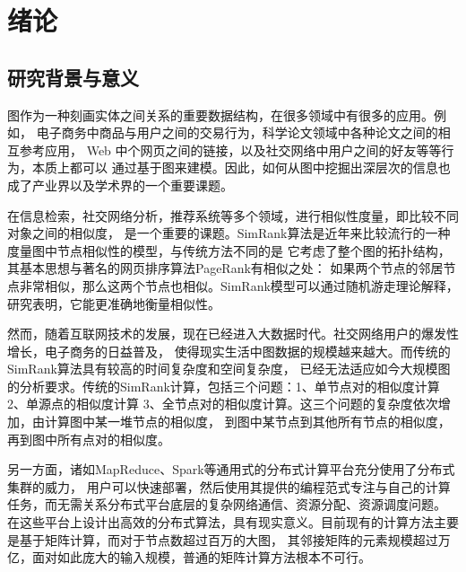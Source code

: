 \documentclass[master]{njuthesis}
\begin{document}
\listoffigures

\listoftables

\mainmatter

\chapter{绪论}\label{chapter_introduction}
\section{研究背景与意义}

图作为一种刻画实体之间关系的重要数据结构，在很多领域中有很多的应用。例如，
电子商务中商品与用户之间的交易行为，科学论文领域中各种论文之间的相互参考应用，
Web 中个网页之间的链接，以及社交网络中用户之间的好友等等行为，本质上都可以
通过基于图来建模。因此，如何从图中挖掘出深层次的信息也成了产业界以及学术界的一个重要课题。

在信息检索，社交网络分析，推荐系统等多个领域，进行相似性度量，即比较不同对象之间的相似度，
是一个重要的课题。SimRank算法是近年来比较流行的一种度量图中节点相似性的模型，与传统方法不同的是
它考虑了整个图的拓扑结构，其基本思想与著名的网页排序算法PageRank有相似之处：
如果两个节点的邻居节点非常相似，那么这两个节点也相似。SimRank模型可以通过随机游走理论解释，
研究表明，它能更准确地衡量相似性。

然而，随着互联网技术的发展，现在已经进入大数据时代。社交网络用户的爆发性增长，电子商务的日益普及，
使得现实生活中图数据的规模越来越大。而传统的SimRank算法具有较高的时间复杂度和空间复杂度，
已经无法适应如今大规模图的分析要求。传统的SimRank计算，包括三个问题：1、单节点对的相似度计算
2、单源点的相似度计算 3、全节点对的相似度计算。这三个问题的复杂度依次增加，由计算图中某一堆节点的相似度，
到图中某节点到其他所有节点的相似度，再到图中所有点对的相似度。

另一方面，诸如MapReduce、Spark等通用式的分布式计算平台充分使用了分布式集群的威力，
用户可以快速部署，然后使用其提供的编程范式专注与自己的计算任务，而无需关系分布式平台底层的复杂网络通信、资源分配、资源调度问题。
在这些平台上设计出高效的分布式算法，具有现实意义。目前现有的计算方法主要是基于矩阵计算，而对于节点数超过百万的大图，
其邻接矩阵的元素规模超过万亿，面对如此庞大的输入规模，普通的矩阵计算方法根本不可行。
\end{document}
